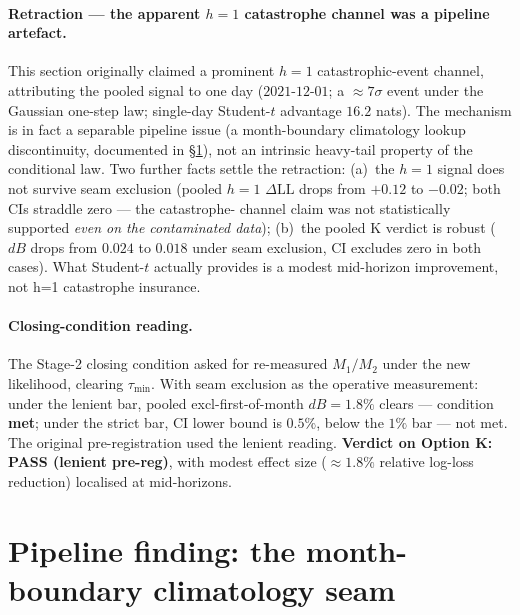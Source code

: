 \documentclass[11pt]{article}
\begin{document}
\paragraph{Retraction --- the apparent \(h = 1\) catastrophe channel
was a pipeline artefact.} This section originally claimed a prominent
\(h = 1\) catastrophic-event channel, attributing the pooled signal
to one day (\(2021\text{-}12\text{-}01\); a \(\approx 7\sigma\) event
under the Gaussian one-step law; single-day Student-\(t\) advantage
\(16.2\) nats). The mechanism is in fact a separable pipeline issue
(a month-boundary climatology lookup discontinuity, documented in
\S\ref{sec:option-k-seam-audit}), not an intrinsic heavy-tail
property of the conditional law. Two further facts settle the
retraction: (a)~the \(h = 1\) signal does not survive seam
exclusion (pooled \(h = 1\) \(\Delta\mathrm{LL}\) drops from
\(+0.12\) to \(-0.02\); both CIs straddle zero --- the catastrophe-
channel claim was not statistically supported \emph{even on the
contaminated data}); (b)~the pooled K verdict is robust (\(dB\) drops
from \(0.024\) to \(0.018\) under seam exclusion, CI excludes zero
in both cases). What Student-\(t\) actually provides is a modest
mid-horizon improvement, not h=1 catastrophe insurance.

\paragraph{Closing-condition reading.} The Stage-2 closing condition
asked for re-measured \(M_1/M_2\) under the new likelihood, clearing
\(\tau_{\min}\). With seam exclusion as the operative measurement:
under the lenient bar, pooled excl-first-of-month \(dB = 1.8\%\)
clears --- condition \textbf{met}; under the strict bar, CI lower
bound is \(0.5\%\), below the \(1\%\) bar --- not met. The original
pre-registration used the lenient reading. \textbf{Verdict on
Option K: PASS (lenient pre-reg)}, with modest effect size
(\(\approx 1.8\%\) relative log-loss reduction) localised at
mid-horizons.

\section{Pipeline finding: the month-boundary climatology seam}
\label{sec:option-k-seam-audit}
\end{document}
